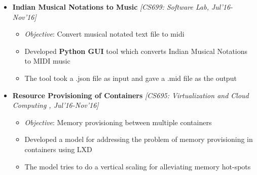 \documentclass[a4paper,10pt]{article}
\newcommand{\hsep}{-0.6cm}
\begin{document}
\begin{itemize}
    \item \textbf{Indian Musical Notations to Music}  \hfill\emph{ [CS699: Software Lab, Jul'16-Nov'16]} \\[\hsep]
        \begin{itemize}
            \item \textit{Objective}: Convert musical notated text file to midi\\[-0.55cm]
	        \item Developed \textbf{Python GUI} tool which converts Indian Musical Notations to MIDI music\\[-0.55cm]
	        \item The tool took a .json file as input and gave a .mid file as the output\\[-0.55cm]
        \end{itemize}
    
    \item \textbf{Resource Provisioning of Containers }  \hfill\emph{ [CS695: Virtualization and Cloud Computing , Jul'16-Nov'16]} \\[\hsep]
        
        \begin{itemize}
            \item \textit{Objective}: Memory provisioning between multiple containers \\[-0.55cm]
	        \item Developed a model for addressing the problem of memory provisioning in containers using LXD \\[-0.55cm]
	        \item The model tries to do a vertical scaling for alleviating memory hot-spots\\[-0.55cm]
        \end{itemize}    
\end{itemize}
\end{document}
